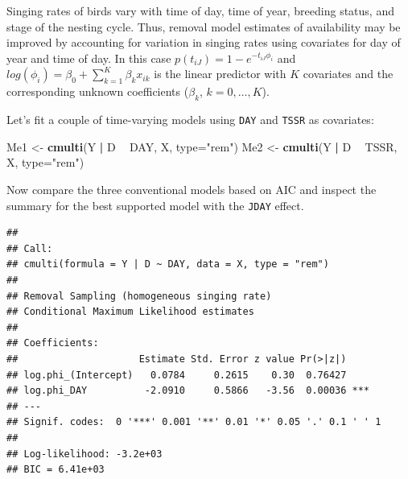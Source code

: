\documentclass[12pt,]{book}
\newenvironment{Shaded}{\begin{snugshade}}{\end{snugshade}}
\newcommand{\DataTypeTok}[1]{\textcolor[rgb]{0.13,0.29,0.53}{#1}}
\newcommand{\DecValTok}[1]{\textcolor[rgb]{0.00,0.00,0.81}{#1}}
\newcommand{\KeywordTok}[1]{\textcolor[rgb]{0.13,0.29,0.53}{\textbf{#1}}}
\newcommand{\NormalTok}[1]{#1}
\newcommand{\OperatorTok}[1]{\textcolor[rgb]{0.81,0.36,0.00}{\textbf{#1}}}
\newcommand{\StringTok}[1]{\textcolor[rgb]{0.31,0.60,0.02}{#1}}
\begin{document}
Singing rates of birds vary with time of day, time of year, breeding status, and stage of the nesting cycle.
Thus, removal model estimates of availability may be improved by accounting for variation in singing rates
using covariates for day of year and time of day.
In this case \(p(t_{iJ}) = 1 - e^{-t_{iJ} \phi_{i}}\) and \(log(\phi_{i}) = \beta_{0} + \sum^{K}_{k=1} \beta_{k} x_{ik}\) is the linear predictor with \(K\) covariates and the corresponding unknown coefficients (\(\beta_{k}\), \(k = 0,\ldots, K\)).

Let's fit a couple of time-varying models using \texttt{DAY} and \texttt{TSSR} as covariates:

\begin{Shaded}
\begin{Highlighting}[]
\NormalTok{Me1 <-}\StringTok{ }\KeywordTok{cmulti}\NormalTok{(Y }\OperatorTok{|}\StringTok{ }\NormalTok{D }\OperatorTok{~}\StringTok{ }\NormalTok{DAY, X, }\DataTypeTok{type=}\StringTok{"rem"}\NormalTok{)}
\NormalTok{Me2 <-}\StringTok{ }\KeywordTok{cmulti}\NormalTok{(Y }\OperatorTok{|}\StringTok{ }\NormalTok{D }\OperatorTok{~}\StringTok{ }\NormalTok{TSSR, X, }\DataTypeTok{type=}\StringTok{"rem"}\NormalTok{)}
\end{Highlighting}
\end{Shaded}

Now compare the three conventional models based on AIC and inspect the summary for the best supported model with the \texttt{JDAY} effect.

\begin{Shaded}
\end{Shaded}

\begin{verbatim}
## 
## Call:
## cmulti(formula = Y | D ~ DAY, data = X, type = "rem")
## 
## Removal Sampling (homogeneous singing rate)
## Conditional Maximum Likelihood estimates
## 
## Coefficients:
##                     Estimate Std. Error z value Pr(>|z|)    
## log.phi_(Intercept)   0.0784     0.2615    0.30  0.76427    
## log.phi_DAY          -2.0910     0.5866   -3.56  0.00036 ***
## ---
## Signif. codes:  0 '***' 0.001 '**' 0.01 '*' 0.05 '.' 0.1 ' ' 1 
## 
## Log-likelihood: -3.2e+03 
## BIC = 6.41e+03
\end{verbatim}
\end{document}

